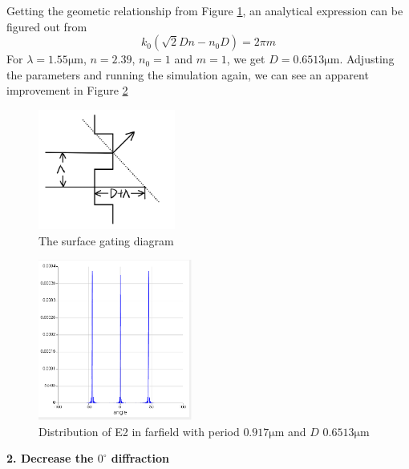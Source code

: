 \documentclass[fontsize=11pt]{scrartcl}
\begin{document}
Getting the geometic relationship from Figure \ref{fig1.3}, 
an analytical expression can be figured out 
from 
\begin{equation}
    k_{0}\left(\sqrt{2} D n-n_{0} D\right)=2 \pi m 
\end{equation} 
For $\lambda=1.55\mathrm{\mu m}$, $n=2.39$, $n_0=1$ and $m=1$, we get $D=0.6513\mathrm{\mu m}$. 
Adjusting the parameters and running the simulation again, 
we can see an apparent improvement in Figure \ref{fig1.4}
\begin{figure}[H]
    \centering
     \includegraphics[width=0.4\textwidth]{img/fig1.3.png}
     \caption{The surface gating diagram}
     \label{fig1.3}
\end{figure}
\begin{figure}[H]
    \centering
     \includegraphics[width=0.45\textwidth]{img/fig1.4.png}
     \caption{Distribution of E2 in farfield with 
     period $0.917\mathrm{\mu m}$ and $D$ $0.6513\mathrm{\mu m}$}
     \label{fig1.4}
\end{figure}

\textbf{2. Decrease the $0^\circ$ diffraction}
\end{document}

